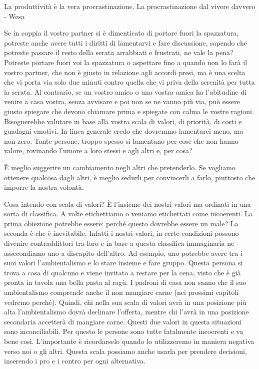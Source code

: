 \documentclass[12pt]{book} %
\begin{document}
La produttività è la vera procrastinazione. La procrastinazione dal vivere davvero - Wesa 

Se in coppia il vostro partner si è dimenticato di portare fuori la
spazzatura, potreste anche avere tutti i diritti di lamentarvi e fare discussione, sapendo che potreste passare il resto della
serata arrabbiati e frustrati, ne vale la pena? Potreste portare fuori voi la spazzatura o aspettare fino a quando non
lo farà il vostro partner, che non è giusto in relazione agli accordi presi, ma è una scelta che vi porta via solo due
minuti contro quella che vi priva della serenità per tutta la serata. Al contrario, se un vostro amico o una vostra
amica ha l'abitudine di venire a casa vostra, senza avvisare e poi non se ne vanno più via, può
essere giusto spiegare che devono chiamare prima e spiegate con calma le vostre ragioni. Bisognerebbe valutare in base
alla vostra scala di valori, di priorità, di costi e guadagni emotivi. In linea generale credo che dovremmo lamentarci
meno, ma non zero. Tante persone, troppo spesso si lamentano per cose che non hanno valore, rovinando
l'umore a loro stessi e agli altri e, per cosa?

È meglio suggerire un cambiamento negli altri che pretenderlo. Se vogliamo ottenere qualcosa dagli altri, è meglio
sedurli per convincerli a farlo, piuttosto che imporre la nostra volontà.

Cosa intendo con scala di valori? È l'insieme dei nostri valori ma ordinati in una sorta di
classifica. A volte etichettiamo o veniamo etichettati come incoerenti. La prima obiezione potrebbe essere: perché
questo dovrebbe essere un male? La seconda è che è inevitabile. Infatti i nostri valori, in certe condizioni possono
divenire contraddittori tra loro e in base a questa classifica immaginaria ne assecondiamo uno a discapito
dell'altro. Ad esempio, uno potrebbe avere tra i suoi valori l'ambientalismo
e lo stare insieme e fare gruppo. Questa persona si trova a casa di qualcuno e viene invitato a restare per la cena,
visto che è già pronta in tavola una bella pasta al ragù. I padroni di casa non sanno che il suo ambientalismo
comprende anche il non mangiare carne (nei prossimi capitoli vedremo perché). Quindi, chi nella sua scala di valori
avrà in una posizione più alta l'ambientalismo dovrà declinare l'offerta,
mentre chi l'avrà in una posizione secondaria accetterà di mangiare carne. Questi due valori in
questa situazioni sono inconciliabili. Per questo le persone sono tutte fatalmente incoerenti e va bene così.
L'importante è ricordarselo quando lo utilizzeremo in maniera negativa verso noi o gli altri.
Questa scala possiamo anche usarla per prendere decisioni, inserendo i pro e i contro per ogni alternativa.
\end{document}
